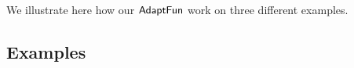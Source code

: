 We illustrate here how our $\textsf{AdaptFun}$ work on three different examples.
%
\subsection{Examples}
%


